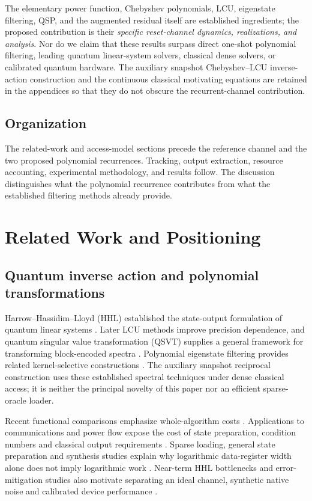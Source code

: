 \documentclass{ieeeaccess}
\begin{document}
The elementary power function, Chebyshev polynomials, LCU, eigenstate filtering, QSP, and the augmented residual itself are established ingredients; the proposed contribution is their \emph{specific reset-channel dynamics, realizations, and analysis}. Nor do we claim that these results surpass direct one-shot polynomial filtering, leading quantum linear-system solvers, classical dense solvers, or calibrated quantum hardware. The auxiliary snapshot Chebyshev--LCU inverse-action construction and the continuous classical motivating equations are retained in the appendices so that they do not obscure the recurrent-channel contribution.

\subsection{Organization}
The related-work and access-model sections precede the reference channel and the two proposed polynomial recurrences. Tracking, output extraction, resource accounting, experimental methodology, and results follow. The discussion distinguishes what the polynomial recurrence contributes from what the established filtering methods already provide.


\section{Related Work and Positioning}
\subsection{Quantum inverse action and polynomial transformations}
Harrow--Hassidim--Lloyd (HHL) established the state-output formulation of quantum linear systems \cite{r1}. Later LCU methods improve precision dependence, and quantum singular value transformation (QSVT) supplies a general framework for transforming block-encoded spectra \cite{r2,r3}. Polynomial eigenstate filtering provides related kernel-selective constructions \cite{filter}. The auxiliary snapshot reciprocal construction uses these established spectral techniques under dense classical access; it is neither the principal novelty of this paper nor an efficient sparse-oracle loader.

Recent functional comparisons emphasize whole-algorithm costs \cite{r5,r6}. Applications to communications and power flow expose the cost of state preparation, condition numbers and classical output requirements \cite{r7,r8,r9}. Sparse loading, general state preparation and synthesis studies explain why logarithmic data-register width alone does not imply logarithmic work \cite{r10,r11,r12,r13}. Near-term HHL bottlenecks and error-mitigation studies also motivate separating an ideal channel, synthetic native noise and calibrated device performance \cite{r14,r15,r16}.
\end{document}
